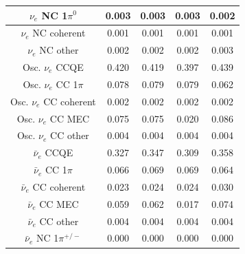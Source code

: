 \begin{table}
\begin{tabular} { | c ||c | c | c | c |  | }
$\nu_e$ NC 1$\pi^0$                               & 0.003               & 0.003               & 0.003               & 0.002                \\ \hline 
$\nu_e$ NC coherent                               & 0.001               & 0.001               & 0.001               & 0.001                \\ \hline 
$\nu_e$ NC other                                  & 0.002               & 0.002               & 0.002               & 0.003                \\ \hline 
Osc. $\nu_e$ CCQE                                 & 0.420               & 0.419               & 0.397               & 0.439                \\ \hline 
Osc. $\nu_e$ CC 1$\pi$                            & 0.078               & 0.079               & 0.079               & 0.062                \\ \hline 
Osc. $\nu_e$ CC coherent                          & 0.002               & 0.002               & 0.002               & 0.002                \\ \hline 
Osc. $\nu_e$ CC MEC                               & 0.075               & 0.075               & 0.020               & 0.086                \\ \hline 
Osc. $\nu_e$ CC other                             & 0.004               & 0.004               & 0.004               & 0.004                \\ \hline 
$\bar{\nu}_e$ CCQE                                & 0.327               & 0.347               & 0.309               & 0.358                \\ \hline 
$\bar{\nu}_e$ CC 1$\pi$                           & 0.066               & 0.069               & 0.069               & 0.064                \\ \hline 
$\bar{\nu}_e$ CC coherent                         & 0.023               & 0.024               & 0.024               & 0.030                \\ \hline 
$\bar{\nu}_e$ CC MEC                              & 0.059               & 0.062               & 0.017               & 0.074                \\ \hline 
$\bar{\nu}_e$ CC other                            & 0.004               & 0.004               & 0.004               & 0.004                \\ \hline 
$\bar{\nu}_e$ NC 1$\pi^{+/-}$                     & 0.000               & 0.000               & 0.000               & 0.000                \\ \hline 

\end{tabular}
\end{table}
